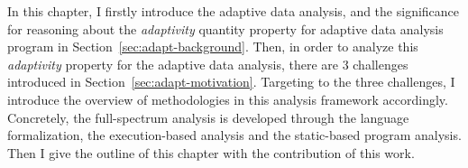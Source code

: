 
In this chapter, 
I firstly introduce the adaptive data analysis, and the
significance for reasoning about the \emph{adaptivity} quantity property 
for adaptive data analysis program in Section~\ref{sec:adapt-background}.
Then, in order to analyze this \emph{adaptivity} property for the adaptive data analysis, there are 3 challenges
introduced in Section~\ref{sec:adapt-motivation}.
Targeting to the three challenges, I introduce the overview of methodologies in this analysis framework accordingly.
Concretely, the full-spectrum analysis is developed through the language formalization,
the execution-based analysis and the static-based program analysis.
Then I give the outline of this chapter with the contribution of this work.





